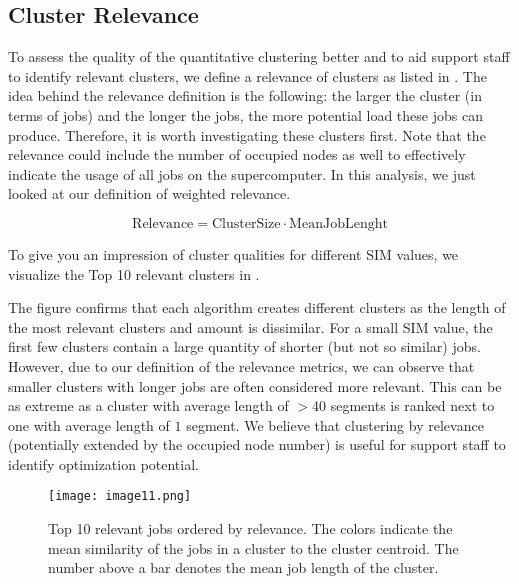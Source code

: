 \documentclass{jhps}
\begin{document}
\subsection{Cluster Relevance}

To assess the quality of the quantitative clustering better and to aid support staff to identify relevant clusters, we define a relevance of clusters as listed in .
The idea behind the relevance definition is the following: the larger the cluster (in terms of jobs) and the longer the jobs, the more potential load these jobs can produce.
Therefore, it is worth investigating these clusters first.
Note that the relevance could include the number of occupied nodes as well to effectively indicate the usage of all jobs on the supercomputer.
In this analysis, we just looked at our definition of weighted relevance.

\begin{equation}
\text{Relevance} = \text{ClusterSize} \cdot \text{MeanJobLenght}
\label{eq:rel}
\end{equation}

To give you an impression of cluster qualities for different SIM values, we visualize the Top 10 relevant clusters in .

The figure confirms that each algorithm creates different clusters as the length of the most relevant clusters and amount is dissimilar.
For a small SIM value, the first few clusters contain a large quantity of shorter (but not so similar) jobs.
However, due to our definition of the relevance metrics, we can observe that smaller clusters with longer jobs are often considered more relevant.
This can be as extreme as a cluster with average length of $>40$ segments is ranked next to one with average length of $1$ segment.
We believe that clustering by relevance (potentially extended by the occupied node number) is useful for support staff to identify optimization potential.



\begin{figure}
  \centering
   \texttt{[image: image11.png]}
   \caption{Top 10 relevant jobs ordered by relevance.
   The colors indicate the mean similarity of the jobs in a cluster to the cluster centroid.
   The number above a bar denotes the mean job length of the cluster.}
   \label{fig:top10_relevant_jobs}
\end{figure}
\end{document}
